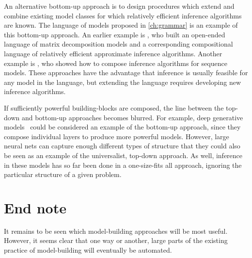 An alternative bottom-up approach is to design procedures which extend and combine existing model classes for which relatively efficient inference algorithms are known.
The language of models proposed in \cref{ch:grammar} is an example of this bottom-up approach.
An earlier example is \citet{roger-grosse-thesis}, who built an open-ended language of matrix decomposition models and a corresponding compositional language of relatively efficient approximate inference algorithms.
Another example is \citet{christian-thesis}, who showed how to compose inference algorithms for sequence models.
These approaches have the advantage that inference is usually feasible for any model in the language, but extending the language requires developing new inference algorithms.

If sufficiently powerful building-blocks are composed, the line between the top-down and bottom-up approaches becomes blurred.
For example, deep generative models~\citep{adams2010learning,damianou2012deep,rippel2013high,bengio2013generalized,salakhutdinov2009deep} could be considered an example of the bottom-up approach, since they compose individual layers to produce more powerful models.
However, large neural nets can capture enough different types of structure that they could also be seen as an example of the universalist, top-down approach.
As well, inference in these models has so far been done in a one-size-fits all approach, ignoring the particular structure of a given problem.

\section{End note}
It remains to be seen which model-building approaches will be most useful.
However, it seems clear that one way or another, large parts of the existing practice of model-building will eventually be automated.












